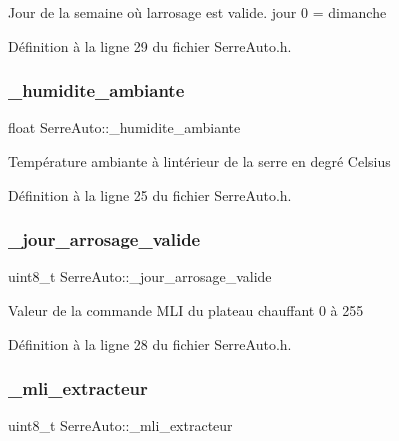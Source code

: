 Jour de la semaine où l\textquotesingle{}arrosage est valide. jour 0 = dimanche 

Définition à la ligne 29 du fichier Serre\+Auto.\+h.

\mbox{\label{class_serre_auto_a5ff23c9f5eee5367cbebf50d8bac22d5}} 
\subsubsection{\+\_\+humidite\+\_\+ambiante}
{\footnotesize\ttfamily float Serre\+Auto\+::\+\_\+humidite\+\_\+ambiante\hspace{0.3cm}{\ttfamily [private]}}

Température ambiante à l\textquotesingle{}intérieur de la serre en degré Celsius 

Définition à la ligne 25 du fichier Serre\+Auto.\+h.

\mbox{\label{class_serre_auto_ad9d91ee76b884609faa71f68ab5e2444}} 
\subsubsection{\+\_\+jour\+\_\+arrosage\+\_\+valide}
{\footnotesize\ttfamily uint8\+\_\+t Serre\+Auto\+::\+\_\+jour\+\_\+arrosage\+\_\+valide\hspace{0.3cm}{\ttfamily [private]}}

Valeur de la commande M\+LI du plateau chauffant 0 à 255 

Définition à la ligne 28 du fichier Serre\+Auto.\+h.

\mbox{\label{class_serre_auto_a61a99344d20c390bf5ae0b32ffef17a9}} 
\subsubsection{\+\_\+mli\+\_\+extracteur}
{\footnotesize\ttfamily uint8\+\_\+t Serre\+Auto\+::\+\_\+mli\+\_\+extracteur\hspace{0.3cm}{\ttfamily [private]}}

